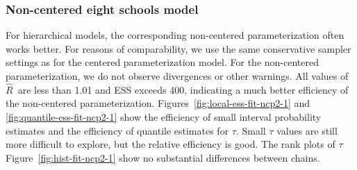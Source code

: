 \documentclass[american,]{article}
\newcommand{\Rhat}{$\widehat{R}$}
\theoremstyle{definition}
\begin{document}
\hypertarget{non-centered-eight-schools-model}{%
\subsubsection*{Non-centered eight schools
model}\label{non-centered-eight-schools-model}}

For hierarchical models, the corresponding non-centered
parameterization often works better. For reasons of comparability, we use the 
same conservative sampler settings as for the centered parameterization model. 
For the non-centered parameterization, we do not observe divergences or 
other warnings.
All values of \Rhat\ are less than 1.01 and ESS exceeds 400, indicating a much
better efficiency of the non-centered parameterization.
Figures~\ref{fig:local-ess-fit-ncp2-1} and
\ref{fig:quantile-ess-fit-ncp2-1} show the efficiency of small interval
probability estimates and the efficiency of quantile estimates for
$\tau$.
Small $\tau$ values are still more difficult to explore, but the relative 
efficiency is good. The rank plots of $\tau$ Figure~\ref{fig:hist-fit-ncp2-1} 
show no substantial differences between chains.
\end{document}
